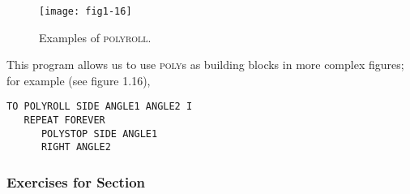 \documentclass{book}
\begin{document}
\begin{figure}
\begin{center}
\texttt{[image: fig1-16]}
\caption{Examples of \textsc{polyroll}.}
\end{center}
\end{figure}

This program allows us to use \textsc{poly}s as building blocks in more complex figures; for example (see figure 1.16),

\begin{verbatim}
TO POLYROLL SIDE ANGLE1 ANGLE2 I
   REPEAT FOREVER
      POLYSTOP SIDE ANGLE1
      RIGHT ANGLE2
\end{verbatim}
\subsubsection{Exercises for Section \thesection}
\end{document}

